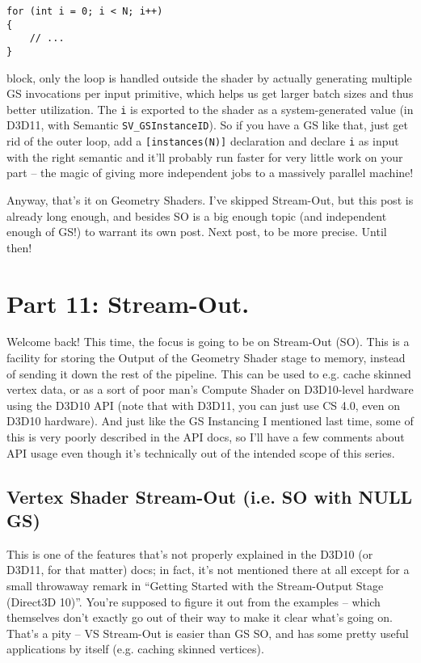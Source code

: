 \documentclass[12pt]{article}
\begin{document}
\begin{verbatim}
for (int i = 0; i < N; i++)
{
    // ...
}
\end{verbatim}

block, only the loop is handled outside the shader by actually generating multiple GS invocations per input primitive, which helps us get larger batch sizes and thus better utilization. The \texttt{i} is exported to the shader as a system-generated value (in D3D11, with Semantic \texttt{SV\_GSInstanceID}). So if you have a GS like that, just get rid of the outer loop, add a \texttt{[instances(N)]} declaration and declare \texttt{i} as input with the right semantic and it’ll probably run faster for very little work on your part – the magic of giving more independent jobs to a massively parallel machine!

Anyway, that’s it on Geometry Shaders. I’ve skipped Stream-Out, but this post is already long enough, and besides SO is a big enough topic (and independent enough of GS!) to warrant its own post. Next post, to be more precise. Until then!
\section{Part 11: Stream-Out.}
\label{sec:orgf2c3c94}
\label{part11}

Welcome back! This time, the focus is going to be on Stream-Out (SO). This is a facility for storing the Output of the Geometry Shader stage to memory, instead of sending it down the rest of the pipeline. This can be used to e.g. cache skinned vertex data, or as a sort of poor man’s Compute Shader on D3D10-level hardware using the D3D10 API (note that with D3D11, you can just use CS 4.0, even on D3D10 hardware). And just like the GS Instancing I mentioned last time, some of this is very poorly described in the API docs, so I’ll have a few comments about API usage even though it’s technically out of the intended scope of this series.

\subsection{Vertex Shader Stream-Out (i.e. SO with NULL GS)}
\label{sec:org6b3fcca}

This is one of the features that’s not properly explained in the D3D10 (or D3D11, for that matter) docs; in fact, it’s not mentioned there at all except for a small throwaway remark in “Getting Started with the Stream-Output Stage (Direct3D 10)”. You’re supposed to figure it out from the examples – which themselves don’t exactly go out of their way to make it clear what’s going on. That’s a pity – VS Stream-Out is easier than GS SO, and has some pretty useful applications by itself (e.g. caching skinned vertices).
\end{document}
